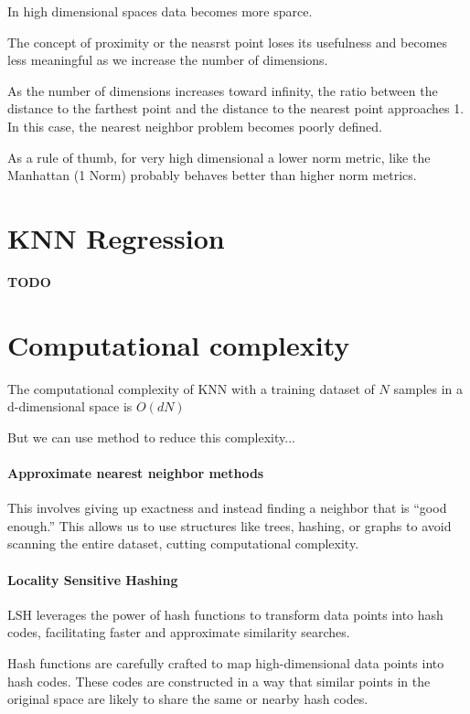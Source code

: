 \documentclass[11pt]{article}
\begin{document}
In high dimensional spaces data becomes more sparce.

The concept of proximity or the neasrst point loses its usefulness and becomes less meaningful
as we increase the number of dimensions.

As the number of dimensions increases toward infinity, the ratio between the distance to the farthest point and the distance to the nearest point approaches 1. In this case, the nearest neighbor problem becomes poorly defined.

As a rule of thumb, for very high dimensional a lower norm metric, like the Manhattan (1 Norm)
probably behaves better than higher norm metrics.


\section*{KNN Regression}
\textbf{TODO}

\section*{Computational complexity}
The computational complexity of KNN with a training dataset of $N$ samples in a d-dimensional space is $O(dN)$

But we can use method to reduce this complexity...
\paragraph{Approximate nearest neighbor methods}
This involves giving up exactness and instead finding a neighbor that is “good enough.” This allows us to use structures like trees, hashing, or graphs to avoid scanning the entire dataset, cutting computational complexity.

\paragraph{Locality Sensitive Hashing}
LSH leverages the power of hash functions to transform data points into hash codes, facilitating faster and approximate similarity searches.

Hash functions are carefully crafted to map high-dimensional data points into hash codes. These codes are constructed in a way that similar points in the original space are likely to share the same or nearby hash codes.
\end{document}
